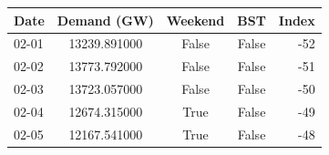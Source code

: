 \begin{tabular}{lcccr}
\toprule
Date & Demand (GW) & Weekend & BST & Index \\
\midrule
02-01 & 13239.891000 & False & False & -52 \\
02-02 & 13773.792000 & False & False & -51 \\
02-03 & 13723.057000 & False & False & -50 \\
02-04 & 12674.315000 & True & False & -49 \\
02-05 & 12167.541000 & True & False & -48 \\
\bottomrule
\end{tabular}
